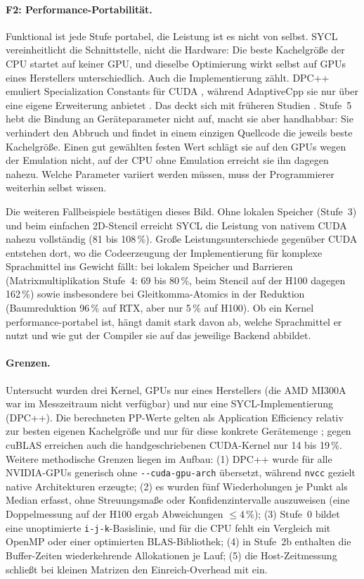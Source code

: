 \documentclass[12pt,a4paper]{article}
\begin{document}
\paragraph{F2: Performance-Portabilität.}
Funktional ist jede Stufe portabel, die Leistung ist es nicht von selbst. SYCL
vereinheitlicht die Schnittstelle, nicht die Hardware: Die beste Kachelgröße
der CPU startet auf keiner GPU, und dieselbe Optimierung wirkt selbst auf GPUs
eines Herstellers unterschiedlich. Auch die Implementierung zählt. DPC++ emuliert
Specialization Constants für CUDA \cite{dpcpp_spec_const}, während AdaptiveCpp
sie nur über eine eigene Erweiterung anbietet \cite{adaptivecpp_ext}. Das deckt
sich mit früheren Studien \cite{deakin2020sycl}. Stufe~5 hebt die Bindung an
Geräteparameter nicht auf, macht sie aber handhabbar: Sie verhindert den Abbruch
und findet in einem einzigen Quellcode die jeweils beste Kachelgröße. Einen gut
gewählten festen Wert schlägt sie auf den GPUs wegen der Emulation nicht, auf
der CPU ohne Emulation erreicht sie ihn dagegen nahezu. Welche Parameter
variiert werden müssen, muss der Programmierer weiterhin selbst wissen.

Die weiteren Fallbeispiele bestätigen dieses Bild. Ohne lokalen Speicher
(Stufe~3) und beim einfachen 2D-Stencil erreicht SYCL die Leistung von nativem
CUDA nahezu vollständig (81 bis 108\,\%). Große Leistungsunterschiede gegenüber
CUDA entstehen dort, wo die Codeerzeugung der Implementierung für komplexe
Sprachmittel ins Gewicht fällt: bei lokalem Speicher und Barrieren
(Matrixmultiplikation Stufe~4: 69 bis 80\,\%, beim Stencil auf der H100 dagegen
162\,\%) sowie insbesondere bei Gleitkomma-Atomics in der Reduktion
(Baumreduktion 96\,\% auf RTX, aber nur 5\,\% auf H100). Ob ein Kernel
performance-portabel ist, hängt damit stark davon ab, welche Sprachmittel er
nutzt und wie gut der Compiler sie auf das jeweilige Backend abbildet.

\paragraph{Grenzen.}
Untersucht wurden drei Kernel, GPUs nur eines Herstellers (die AMD MI300A war
im Messzeitraum nicht verfügbar) und nur eine SYCL-Implementierung (DPC++). Die
berechneten PP-Werte gelten als Application Efficiency relativ zur besten
eigenen Kachelgröße und nur für diese konkrete Gerätemenge
\cite{pennycook2019implications}; gegen cuBLAS erreichen auch die
handgeschriebenen CUDA-Kernel nur 14 bis 19\,\%. Weitere methodische Grenzen
liegen im Aufbau: (1) DPC++ wurde für alle NVIDIA-GPUs generisch ohne
\texttt{-{}-cuda-gpu-arch} übersetzt, während \texttt{nvcc} gezielt native
Architekturen erzeugte; (2) es wurden fünf Wiederholungen je Punkt als Median
erfasst, ohne Streuungsmaße oder Konfidenzintervalle auszuweisen (eine
Doppelmessung auf der H100 ergab Abweichungen $\le 4\,\%$); (3) Stufe~0 bildet
eine unoptimierte \texttt{i-j-k}-Basislinie, und für die CPU fehlt ein
Vergleich mit OpenMP oder einer optimierten BLAS-Bibliothek; (4) in Stufe~2b
enthalten die Buffer-Zeiten wiederkehrende Allokationen je Lauf; (5) die
Host-Zeitmessung schließt bei kleinen Matrizen den Einreich-Overhead mit ein.
\end{document}

